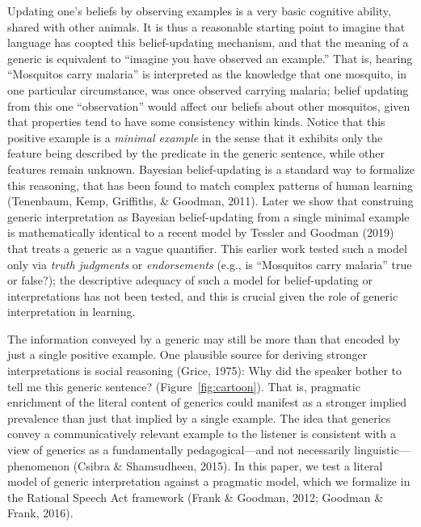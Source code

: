 \documentclass[floatsintext,doc]{apa6}
\begin{document}

Updating one's beliefs by observing examples is a very basic cognitive ability, shared with other animals. 
It is thus a reasonable starting point to imagine that language has coopted this belief-updating mechanism, and that the meaning of a generic is equivalent to ``imagine you have observed an example.''
That is, hearing \enquote{Mosquitos carry malaria} is interpreted as the knowledge that one mosquito, in one particular circumstance, was once observed carrying malaria; belief updating from this one ``observation'' would affect our beliefs about other mosquitos, given that properties tend to have some consistency within kinds.
Notice that this positive example is a \emph{minimal example} in the sense that it exhibits only the feature being described by the predicate in the generic sentence, while other features remain unknown.
Bayesian belief-updating is a standard way to formalize this reasoning, that has been found to match complex patterns of human learning (Tenenbaum, Kemp, Griffiths, \& Goodman, 2011).
Later we show that construing generic interpretation as Bayesian belief-updating from a single minimal example is mathematically identical to a recent model by Tessler and Goodman (2019) that treats a generic as a vague quantifier.
This earlier work tested such a model only via \emph{truth judgments} or \emph{endorsements} (e.g., is \enquote{Mosquitos carry malaria} true or false?); the descriptive adequacy of such a model for belief-updating or interpretations has not been tested, and this is crucial given the role of generic interpretation in learning. 

The information conveyed by a generic may still be more than that encoded by just a single positive example.
One plausible source for deriving stronger interpretations is social reasoning (Grice, 1975): Why did the speaker bother to tell me this generic sentence? (Figure~\ref{fig:cartoon}).
That is, pragmatic enrichment of the literal content of generics could manifest as a stronger implied prevalence than just that implied by a single example.
The idea that generics convey a communicatively relevant example to the listener is consistent with a view of generics as a fundamentally pedagogical---and not necessarily linguistic---phenomenon (Csibra \& Shamsudheen, 2015).
In this paper, we test a literal model of generic interpretation against a pragmatic model, which we formalize in the Rational Speech Act framework (Frank \& Goodman, 2012; Goodman \& Frank, 2016).
\end{document}
